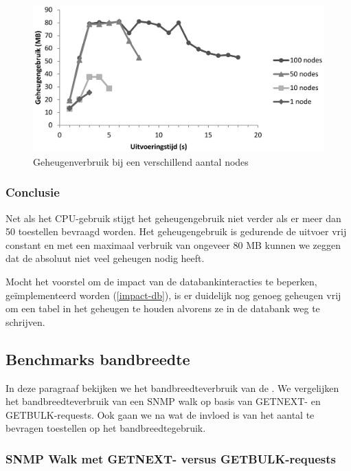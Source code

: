 \begin{figure}[h]
	\centering
	\includegraphics[scale=0.40]{figures/ram-100nodes}
	\caption{Geheugenverbruik bij een verschillend aantal nodes}
	\label{fig-ram-aantalnodes}
\end{figure}

\subsubsection{Conclusie}

Net als het CPU-gebruik stijgt het geheugengebruik niet verder als er meer dan 50 toestellen bevraagd worden.
Het geheugengebruik is gedurende de uitvoer vrij constant en met een maximaal verbruik van ongeveer 80 MB kunnen we zeggen dat
de \nwmretriever{} absoluut niet veel geheugen nodig heeft.

Mocht het voorstel om de impact van de databankinteracties te beperken, geïmplementeerd worden (\cref{impact-db}),
is er duidelijk nog genoeg geheugen vrij om een tabel in het geheugen te houden alvorens ze in de databank weg te schrijven. 


\subsection{Benchmarks bandbreedte}
\label{benchmarks-bandbreedte}

In deze paragraaf bekijken we het bandbreedteverbruik van de \nwmretriever{}.
We vergelijken het bandbreedteverbruik van een SNMP walk op basis van GETNEXT- en GETBULK-requests.
Ook gaan we na wat de invloed is van het aantal te bevragen toestellen op het bandbreedtegebruik.

\subsubsection{SNMP Walk met GETNEXT- versus GETBULK-requests}


